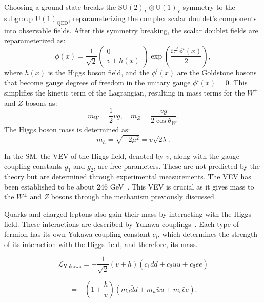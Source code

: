 Choosing a ground state breaks the $\mathrm{SU}(2)_L \otimes \mathrm{U}(1)_Y$ symmetry to the subgroup $\mathrm{U}(1)_\text{QED}$, reparameterizing the complex scalar doublet's components into observable fields.
After this symmetry breaking, the scalar doublet fields are reparameterized as:
\begin{equation}
\phi(x) = \frac{1}{\sqrt{2}}
\begin{pmatrix}
0 \\
v + h(x)
\end{pmatrix}
\exp\left( \frac{i \tau^i \phi^i(x)}{2} \right),
\end{equation}
where $h(x)$ is the Higgs boson field, and the $\phi^i(x)$ are the Goldstone bosons that become gauge degrees of freedom in the unitary gauge $\phi^i(x) = 0$. This simplifies the kinetic term of the Lagrangian, resulting in mass terms for the $W^\pm$ and $Z$ bosons as:
\begin{equation}
m_W = \frac{1}{2}vg, \quad m_Z = \frac{vg}{2\cos\theta_W}.
\end{equation}
The Higgs boson mass is determined as:
\begin{equation}
m_h = \sqrt{-2\mu^2} = v\sqrt{2\lambda}.
\end{equation}

In the SM, the VEV of the Higgs field, denoted by \( v \), along with the gauge coupling constants \( g_1 \) and \( g_2 \), are free parameters. These are not predicted by the theory but are determined through experimental measurements. The VEV has been established to be about 246 GeV~\cite{Plehn_2005}. This VEV is crucial as it gives mass to the $W^\pm$ and $Z$ bosons through the mechanism previously discussed.

Quarks and charged leptons also gain their mass by interacting with the Higgs field. These interactions are described by Yukawa couplings~\cite{10.1143/PTPS.1.1}.
Each type of fermion has its own Yukawa coupling constant \( c_i \), which determines the strength of its interaction with the Higgs field, and therefore, its mass.


\begin{equation}
\mathcal{L}_\text{Yukawa} = -\frac{1}{\sqrt{2}} (v + h)(c_{1} \bar{d}d + c_{2} \bar{u}u + c_{3} \bar{e}e)
\end{equation}

\begin{equation}
= -\left( 1 + \frac{h}{v} \right)(m_{d} \bar{d}d + m_{u} \bar{u}u + m_{e} \bar{e}e) .
\end{equation}


